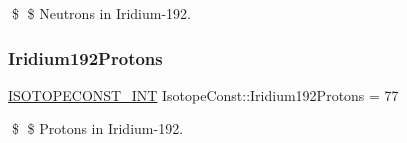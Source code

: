 \$ \$ Neutrons in Iridium-\/192. \mbox{\label{group___isotope_const-_iridium-_ir192_ga109ac737e9d24196c151a6da33feaf2f}} 
\subsubsection{\texorpdfstring{Iridium192\+Protons}{Iridium192Protons}}
{\footnotesize\ttfamily \mbox{\hyperlink{group___isotope_const-_macros_ga5f18360b3e99483a35c32d789e62621c}{I\+S\+O\+T\+O\+P\+E\+C\+O\+N\+S\+T\+\_\+\+I\+NT}} Isotope\+Const\+::\+Iridium192\+Protons = 77}

\$ \$ Protons in Iridium-\/192. 